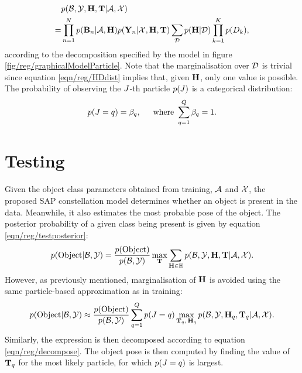 \begin{equation}
	\begin{aligned}
	& p(\mathcal{B},\mathcal{Y},\mathbf{H},\mathbf{T}|\mathcal{A},\mathcal{X}) \\  
	= & \prod_{n=1}^N
	p(\mathbf{B}_{n}|\mathcal{A},\mathbf{H})
	p(\mathbf{Y}_{n}|\mathcal{X},\mathbf{H},\mathbf{T})
	\sum_{\mathcal{D}}
	p(\mathbf{H}|\mathcal{D})
	\prod_{k=1}^K
	p({D}_{k}),
	\end{aligned}
	\label{eqn/reg/decompose}
\end{equation}
according to the decomposition specified by the model in figure \ref{fig/reg/graphicalModelParticle}.
Note that the marginalisation over $\mathcal{D}$ is trivial since equation \ref{eqn/reg/HDdist} implies that, given $\mathbf{H}$, only one value is possible. 
The probability of observing the ${J}$-th particle $p({J})$ is a categorical distribution:
\begin{equation}
	\begin{aligned}
		p({J} = q) & = {\beta}_q, & ~ \mbox{ where }   \sum_{q=1}^Q {\beta}_q = 1. 
	\end{aligned}
\end{equation}

\section{Testing}

Given the object class parameters obtained from training, $\mathcal{A}$ and $\mathcal{X}$, the proposed SAP constellation model determines whether an object is present in the data. Meanwhile, it also estimates the most probable pose of the object. 
The posterior probability of a given class being present is given by equation \ref{eqn/reg/testposterior}: 
\begin{equation}
	p(\mathrm{Object}|\mathcal{B},\mathcal{Y}) = \displaystyle\frac{p(\mathrm{Object})}{p(\mathcal{B},\mathcal{Y})}\max_{\mathbf{T}}\sum_{\mathbf{H} \in \mathbb{H}}p(\mathcal{B},\mathcal{Y},\mathbf{H},\mathbf{T}|\mathcal{A},\mathcal{X}).
	\label{eqn/reg/testposterior}
\end{equation}
However, as previously mentioned, marginalisation of $\mathbf{H}$ is avoided using the same particle-based approximation as in training:
\begin{equation}
	p(\mathrm{Object}|\mathcal{B},\mathcal{Y}) \approx \displaystyle\frac{p(\mathrm{Object})}{p(\mathcal{B},\mathcal{Y})} \sum_{q=1}^Q p({J} = q)
	\max_{\mathbf{T}_q,\,\mathbf{H}_q} p(\mathcal{B},\mathcal{Y},\mathbf{H}_q,\mathbf{T}_q|\mathcal{A},\mathcal{X}).
	\label{eqn/reg/testobjective}
\end{equation}
Similarly, the expression is then decomposed according to equation \ref{eqn/reg/decompose}.
The object pose is then computed by finding the value of $\mathbf{T}_q$ for the most likely particle, \ie for which $p({J} = q)$ is largest.


